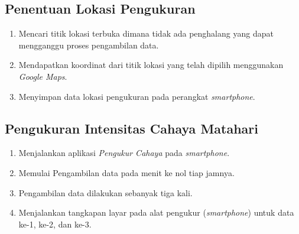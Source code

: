 \subsection{Penentuan Lokasi Pengukuran}
\begin{enumerate}[leftmargin=*, label=\alph*]
    \item Mencari titik lokasi terbuka dimana tidak ada penghalang yang dapat mengganggu proses pengambilan data.
    \item Mendapatkan koordinat dari titik lokasi yang telah dipilih menggunakan \textit{Google Maps}.
    \item Menyimpan data lokasi pengukuran pada perangkat \textit{smartphone}.
\end{enumerate}
\subsection{Pengukuran Intensitas Cahaya Matahari}
\begin{enumerate}[leftmargin=*, label=\alph*]
    \item Menjalankan aplikasi \textit{Pengukur Cahaya} pada \textit{smartphone}.
    \item Memulai Pengambilan data pada menit ke nol tiap jamnya.
    \item Pengambilan data dilakukan sebanyak tiga kali.
    \item Menjalankan tangkapan layar pada alat pengukur (\textit{smartphone}) untuk data ke-1, ke-2, dan ke-3.
\end{enumerate}
